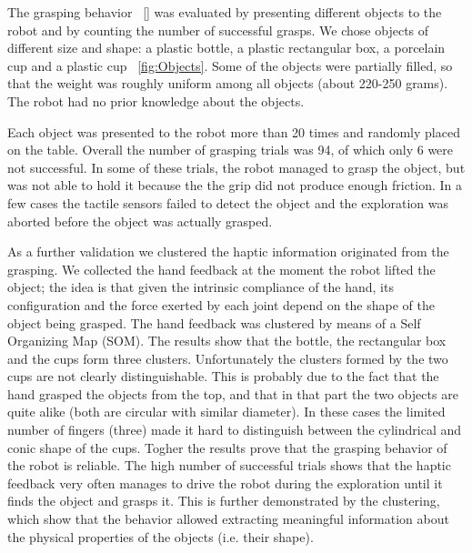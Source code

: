 The grasping behavior ~\ref{} was evaluated by presenting different 
objects to the robot and by counting the number of successful grasps. 
We chose objects of different size and shape: 
a plastic bottle, a plastic rectangular box, a porcelain cup 
and a plastic cup ~\ref{fig:Objects}. Some of the objects were partially 
filled, so that the weight was roughly uniform among all objects (about 220-250 grams). 
The robot had no prior knowledge about the objects.

Each object was presented to the robot more than 20 times and randomly placed 
on the table. Overall the number of grasping trials was 94, of which only 
6 were not successful. In some of these 
trials, the robot managed to grasp the object, but was not able to hold it
because the the grip did not produce enough friction. In a few cases the 
tactile sensors failed to detect the object and the exploration was aborted 
before the object was actually grasped.

As a further validation we clustered the haptic information originated from 
the grasping. We collected the hand feedback at the moment the robot lifted the 
object; the idea is that given the intrinsic compliance of the hand, its 
configuration and the force exerted by each joint depend on the shape of the
object being grasped.
The hand feedback was clustered by means of a Self Organizing Map (SOM). The results 
show that the bottle, the rectangular box and the cups form three clusters. 
Unfortunately the clusters formed by the two cups are not clearly distinguishable. 
This is probably due to the fact that the hand grasped the objects from the
top, and that in that part the two objects are quite alike (both are circular with 
similar diameter). In these cases the limited number of fingers (three) 
made it hard to distinguish between the cylindrical and conic shape of the cups.
Togher the results prove that the grasping behavior of 
the robot is reliable. The high number of successful trials shows that the haptic 
feedback very often manages to drive the robot during the exploration until it 
finds the object and grasps it. This is further demonstrated by the clustering, 
which show that the behavior allowed extracting meaningful information about the 
physical properties of the objects (i.e. their shape). 


